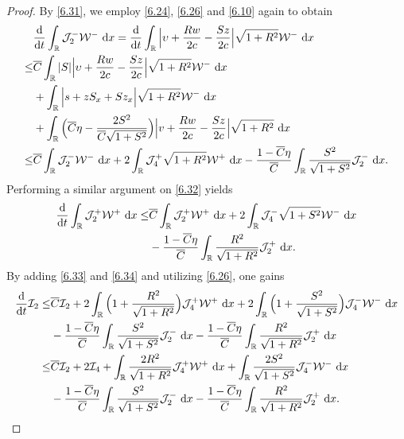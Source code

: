 \documentclass[11pt,reqno]{article}
\newcommand{\fr}{\frac}
\numberwithin{equation}{section}
\begin{document}
\begin{proof}
By \eqref{6.31}, we employ \eqref{6.24}, \eqref{6.26} and \eqref{6.10} again to obtain
\begin{align}\label{6.33}
\begin{split}
&\fr{{\rm d}}{{\rm d}t}\int_{\mathbb{R}} \mathcal{J}_{2}^-\mathcal{W}^-\ {\rm d}x=\fr{{\rm d}}{{\rm d}t}\int_{\mathbb{R}} \Big|\upsilon+\fr{Rw}{2c}-\fr{Sz}{2c}\Big|\sqrt{1+R^2}\mathcal{W}^-\ {\rm d}x \\
\leq & \overline{C}\int_{\mathbb{R}}  |S|\Big|\upsilon+\fr{Rw}{2c}-\fr{Sz}{2c}\Big|\sqrt{1+R^2}\mathcal{W}^-\ {\rm d}x \\
&+\int_{\mathbb{R}}  \Big|s+zS_x+Sz_x\Big|\sqrt{1+R^2}\mathcal{W}^-\ {\rm d}x \\
&+\int_{\mathbb{R}}  \Big(\overline{C}\eta-\fr{2S^2}{\overline{C}\sqrt{1+S^2}}\Big) \Big|v+\fr{Rw}{2c}-\fr{Sz}{2c}\Big|\sqrt{1+R^2}\ {\rm d}x
\\
\leq & \overline{C}\int_{\mathbb{R}}  \mathcal{J}_{2}^-\mathcal{W}^-\ {\rm d}x  +2\int_{\mathbb{R}}  \mathcal{J}_{4}^+\sqrt{1+R^2}\mathcal{W}^+\ {\rm d}x  -\fr{1-\overline{C}\eta}{\overline{C}}\int_{\mathbb{R}}  \fr{S^2}{\sqrt{1+S^2}} \mathcal{J}_{2}^-\ {\rm d}x.
\end{split}
\end{align}
Performing a similar argument on \eqref{6.32} yields
\begin{align}\label{6.34}
\begin{split}
\fr{{\rm d}}{{\rm d}t}\int_{\mathbb{R}} \mathcal{J}_{2}^+\mathcal{W}^+\ {\rm d}x
\leq & \overline{C}\int_{\mathbb{R}}  \mathcal{J}_{2}^+\mathcal{W}^+\ {\rm d}x  +2\int_{\mathbb{R}}  \mathcal{J}_{4}^-\sqrt{1+S^2}\mathcal{W}^-\ {\rm d}x  \\ &-\fr{1-\overline{C}\eta}{\overline{C}}\int_{\mathbb{R}}  \fr{R^2}{\sqrt{1+R^2}} \mathcal{J}_{2}^+\ {\rm d}x.
\end{split}
\end{align}
By adding \eqref{6.33} and \eqref{6.34} and utilizing \eqref{6.26}, one gains
\begin{align}\label{6.35}
\begin{split}
\fr{{\rm d}}{{\rm d}t}\mathcal{I}_2
\leq & \overline{C}\mathcal{I}_2  +2\int_{\mathbb{R}}  \Big(1+\fr{R^2}{\sqrt{1+R^2}}\Big)\mathcal{J}_{4}^+\mathcal{W}^+\ {\rm d}x  +2\int_{\mathbb{R}}  \Big(1+\fr{S^2}{\sqrt{1+S^2}}\Big)\mathcal{J}_{4}^-\mathcal{W}^-\ {\rm d}x  \\ &-\fr{1-\overline{C}\eta}{\overline{C}}\int_{\mathbb{R}}  \fr{S^2}{\sqrt{1+S^2}} \mathcal{J}_{2}^-\ {\rm d}x -\fr{1-\overline{C}\eta}{\overline{C}}\int_{\mathbb{R}}  \fr{R^2}{\sqrt{1+R^2}} \mathcal{J}_{2}^+\ {\rm d}x \\
\leq &\overline{C}\mathcal{I}_2  +2\mathcal{I}_4  +\int_{\mathbb{R}}  \fr{2R^2}{\sqrt{1+R^2}}\mathcal{J}_{4}^+\mathcal{W}^+\ {\rm d}x  +\int_{\mathbb{R}}  \fr{2S^2}{\sqrt{1+S^2}}\mathcal{J}_{4}^-\mathcal{W}^-\ {\rm d}x  \\ &-\fr{1-\overline{C}\eta}{\overline{C}}\int_{\mathbb{R}}  \fr{S^2}{\sqrt{1+S^2}} \mathcal{J}_{2}^-\ {\rm d}x -\fr{1-\overline{C}\eta}{\overline{C}}\int_{\mathbb{R}}  \fr{R^2}{\sqrt{1+R^2}} \mathcal{J}_{2}^+\ {\rm d}x.
\end{split}
\end{align}


\end{proof}
\end{document}
